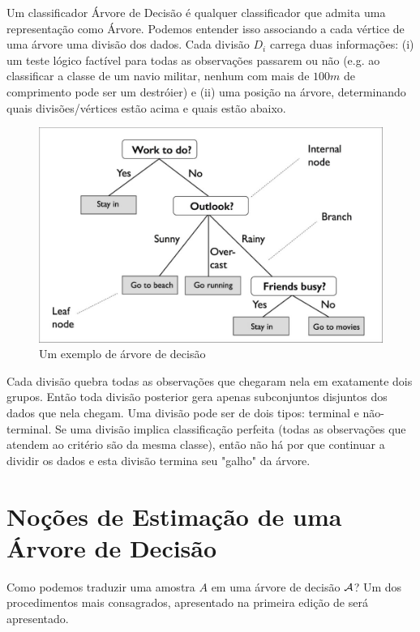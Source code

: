 Um classificador Árvore de Decisão é qualquer classificador que admita uma representação como Árvore. Podemos entender isso associando a cada vértice de uma árvore uma divisão dos dados. Cada divisão $D_i$ carrega duas informações: (i) um teste lógico factível para todas as observações passarem ou não (e.g. ao classificar a classe de um navio militar, nenhum com mais de $100m$ de comprimento pode ser um destróier) e (ii) uma posição na árvore, determinando quais divisões/vértices estão acima e quais estão abaixo.

\begin{figure}
    \centering
    \includegraphics[scale = .25]{imagens/arvore.png}
    \caption{Um exemplo de árvore de decisão}
    \label{fig:arvore}
\end{figure}

Cada divisão quebra todas as observações que chegaram nela em exatamente dois grupos. Então toda divisão posterior gera apenas subconjuntos disjuntos dos dados que nela chegam. Uma divisão pode ser de dois tipos: terminal e não-terminal. Se uma divisão implica classificação perfeita (todas as observações que atendem ao critério são da mesma classe), então não há por que continuar a dividir os dados e esta divisão termina seu "galho" da árvore. 


\section{Noções de Estimação de uma Árvore de Decisão}

Como podemos traduzir uma amostra $A$ em uma árvore de decisão $\mathcal{A}$? Um dos procedimentos mais consagrados, apresentado na primeira edição de  será apresentado.


